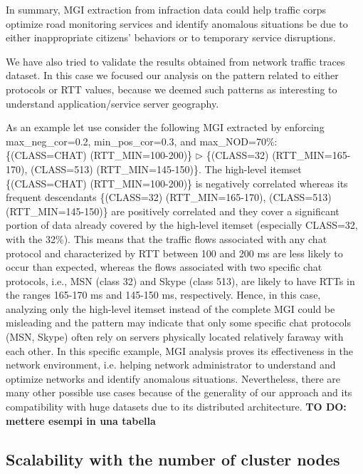 In summary, MGI extraction from infraction data could help traffic corps optimize road monitoring services and identify anomalous situations be due to either inappropriate citizens' behaviors or to temporary service disruptions.

We have also tried to validate the results obtained from network traffic traces dataset. In this case we focused our analysis on the pattern related to either protocols or RTT values, because we deemed such patterns as interesting to understand application/service server geography.

As an example let use consider the following MGI extracted by enforcing max\_neg\_cor=0.2, min\_pos\_cor=0.3, and max\_NOD=70\%:\\ \{(CLASS=CHAT)	(RTT\_MIN=100-200)\} $\triangleright$ \{(CLASS=32) (RTT\_MIN=165-170), (CLASS=513) (RTT\_MIN=145-150)\}.
The high-level itemset \{(CLASS=CHAT) (RTT\_MIN=100-200)\} is negatively correlated whereas its frequent descendants \{(CLASS=32) (RTT\_MIN=165-170), (CLASS=513) (RTT\_MIN=145-150)\} are positively correlated and they cover a significant portion of data already covered by the high-level itemset (especially CLASS=32, with the 32\%). This means that the traffic flows associated with any chat protocol and characterized by RTT between 100 and 200 ms are less likely to occur than expected, whereas the flows associated with two specific chat protocols, i.e., MSN (class 32) and Skype (class 513), are likely to have RTTs in the ranges 165-170 ms and 145-150 ms, respectively. Hence, in this case, analyzing only the high-level itemset instead of the complete MGI could be misleading and the pattern may indicate that only some specific chat protocols (MSN, Skype) often rely on servers physically located relatively faraway with each other. In this specific example, MGI analysis proves its effectiveness in the network environment, i.e. helping network administrator to understand and optimize networks and identify anomalous situations. Nevertheless, there are many other possible use cases because of the generality of our approach and its compatibility with huge datasets due to its distributed architecture. \textbf{TO DO: mettere esempi in una tabella}

\subsection{Scalability with the number of cluster nodes}
\label{scalability}

